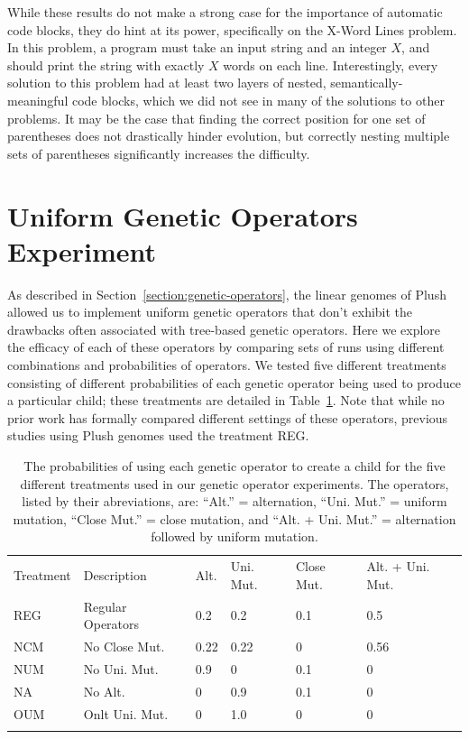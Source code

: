 \documentclass[graybox]{svmult}
\begin{document}
While these results do not make a strong case for the importance of automatic code blocks, they do hint at its power, specifically on the X-Word Lines problem. In this problem, a program must take an input string and an integer $X$, and should print the string with exactly $X$ words on each line. Interestingly, every solution to this problem had at least two layers of nested, semantically-meaningful code blocks, which we did not see in many of the solutions to other problems. It may be the case that finding the correct position for one set of parentheses does not drastically hinder evolution, but correctly nesting multiple sets of parentheses significantly increases the difficulty.


\section{Uniform Genetic Operators Experiment}

As described in Section~\ref{section:genetic-operators}, the linear genomes of Plush allowed us to implement uniform genetic operators that don't exhibit the 
drawbacks often associated with tree-based genetic operators. Here we explore the efficacy of each of these operators by comparing sets of runs using different combinations and probabilities of operators. We tested five different treatments consisting of different probabilities of each genetic operator being used to produce a particular child; these treatments are detailed in Table~\ref{genetic-operator-combinations}. Note that while no prior work has formally compared different settings of these operators, previous studies using Plush genomes \cite{Helmuth:2015:GECCO, Helmuth:2015:GPTP, McPhee:2015:GPTP} used the treatment REG.

\begin{table}[t]
\centering
\caption{The probabilities of using each genetic operator to create a child for the five different treatments used in our genetic operator experiments. The operators, listed by their abreviations, are:
``Alt.'' = alternation,
``Uni. Mut.'' = uniform mutation,
``Close Mut.'' = close mutation, and
``Alt. + Uni. Mut.'' = alternation followed by uniform mutation.}
\label{genetic-operator-combinations}
\begin{tabular}{ll llll}
\hline\noalign{\smallskip}
Treatment & Description & Alt. & Uni. Mut. & Close Mut. & Alt. + Uni. Mut. \\
\noalign{\smallskip}\svhline\noalign{\smallskip}
REG & Regular Operators &  0.2 &  0.2 &  0.1 &  0.5  \\
NCM & No Close Mut.  &  0.22 &  0.22 &  0 &  0.56  \\
NUM & No Uni. Mut. &  0.9 &  0 &  0.1 &  0  \\
NA  & No Alt. &  0 &  0.9 &  0.1 &  0  \\
OUM & Onlt Uni. Mut. &  0 &  1.0 &  0 &  0  \\
\noalign{\smallskip}\hline\noalign{\smallskip}
\end{tabular}
\end{table}
\end{document}
